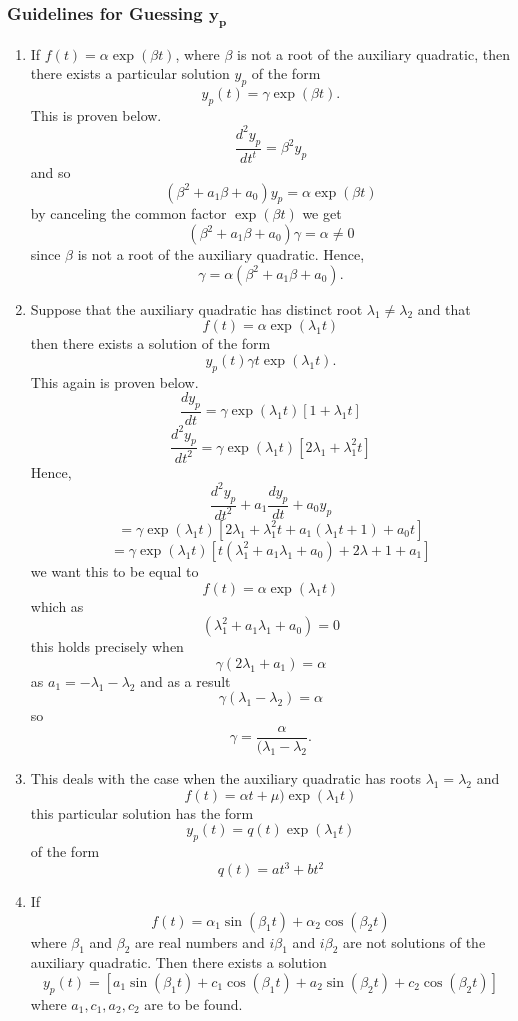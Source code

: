 \subsubsection*{Guidelines for Guessing $\mathbf{y_p}$}
\begin{enumerate}
\item If $f(t) = \alpha \exp (\beta t)$, where $\beta$ is not a root of the auxiliary quadratic, then there exists a particular solution $y_p$ of the form $$y_p(t) = \gamma \exp (\beta t).$$ This is proven below.
$$\frac{d^2y_p}{dt^t}=\beta^2 y_p$$ and so$$(\beta^2 + a_1\beta +a_0)y_p = \alpha \exp (\beta t)$$ by canceling the common factor $\exp (\beta t)$ we get $$(\beta^2 + a_1\beta +a_0)\gamma = \alpha \neq 0$$ since $\beta$ is not a root of the auxiliary quadratic. Hence,
$$\gamma = \alpha (\beta^2 + a_1\beta +a_0).$$
\item Suppose that the auxiliary quadratic has distinct root $\lambda_1 \neq \lambda_2$ and that $$f(t) = \alpha \exp (\lambda_1 t)$$ then there exists a solution of the form $$y_p(t) \gamma t \exp (\lambda_1 t).$$ This again is proven below. $$\frac{dy_p}{dt}=\gamma \exp (\lambda_1 t) [1 + \lambda_1 t]$$
$$\frac{d^2y_p}{dt^2}=\gamma \exp (\lambda_1 t) [2\lambda_1 + \lambda_1^2 t]$$ Hence, $$\frac{d^2 y_p}{dt^2}+ a_1\frac{dy_p}{dt}+a_0y_p $$ $$=\gamma \exp (\lambda_1 t) [2\lambda_1 + \lambda_1^2 t + a_1(\lambda_1 t +1) + a_0 t]$$ $$= \gamma \exp (\lambda_1 t) [t (\lambda_1^2 + a_1\lambda_1 + a_0) + 2\lambda+1 +a_1]$$
we want this to be equal to $$f(t) = \alpha \exp (\lambda_1 t)$$ which as $$(\lambda_1^2 + a_1\lambda_1 + a_0) = 0 $$ this holds precisely when $$\gamma(2 \lambda_1 + a_1)= \alpha $$ as $a_1 = -\lambda_1 -\lambda_2$ and as a result $$\gamma (\lambda_1-\lambda_2) = \alpha$$ so
$$\gamma = \frac{\alpha}{(\lambda_1-\lambda_2}.$$
\item This deals with the case when the auxiliary quadratic has roots $\lambda_1 = \lambda_2$ and $$f(t)= \alpha t + \mu) \exp (\lambda_1 t)$$ this particular solution has the form  $$y_p(t) = q(t) \exp (\lambda_1 t) $$ of the form $$q (t) = a t^3  + bt^2$$
\item If $$f(t) = \alpha_1 \sin (\beta_1 t) + \alpha_2 \cos (\beta_2 t)$$ where $\beta_1$ and $\beta_2$ are real numbers and $i\beta_1$ and $i\beta_2$ are not solutions of the auxiliary quadratic. Then there exists a solution $$y_p(t) = [a_1 \sin (\beta_1 t) + c_1 \cos (\beta_1 t ) + a_2 \sin (\beta_2 t) + c_2 \cos (\beta_2 t ) ]$$ where $a_1, c_1, a_2, c_2$ are to be found.
\end{enumerate}
